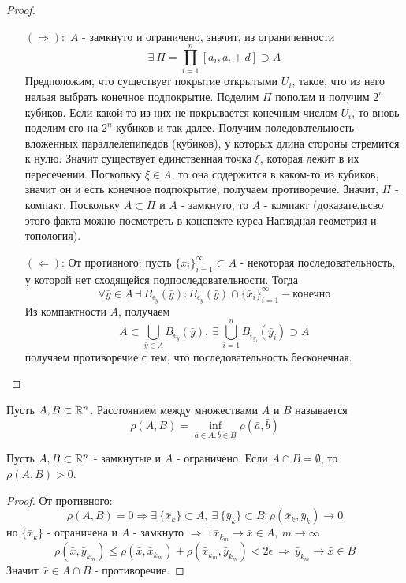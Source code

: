 \begin{proof}\tab
    \begin{itemize}
        \item[$(\Rightarrow):$] $A$ - замкнуто и ограничено, значит, из ограниченности
        \[\exists\ \Pi=\prod\limits_{i=1}^{n}[a_i, a_i+d]\supset A\] 
        Предположим, что существует покрытие открытыми $U_i$, такое, что из него нельзя выбрать конечное подпокрытие. Поделим $\Pi$ пополам и получим $2^n$ кубиков. Если какой-то из них не покрывается конечным числом $U_i$, то вновь поделим его на $2^n$ кубиков и так далее. Получим поледовательность вложенных параллелепипедов (кубиков), у которых длина стороны стремится к нулю. Значит существует единственная точка $\xi$, которая лежит в их пересечении. Поскольку $\xi \in A$, то она содержится в каком-то из кубиков, значит он и есть конечное подпокрытие, получаем противоречие. Значит, $\Pi$ - компакт. Поскольку $A\subset \Pi$ и $A$ - замкнуто, то $A$ - компакт (доказательсво этого факта можно посмотреть в конспекте курса \href{https://github.com/betel-git/Visual-geometry-and-topology}{Наглядная геометрия и топология}).
        \item[$(\Leftarrow)$:] От противного: пусть $\{\bar{x}_i\}_{i=1}^{\infty}\subset A$ - некоторая последовательность, у которой нет сходящейся подпоследовательности. Тогда 
        \[\forall \bar{y}\in A\ \exists\ B_{\epsilon_y}(\bar{y}): B_{\epsilon_y}(\bar{y})\cap \{\bar{x}_i\}_{i=1}^{\infty} - \text{конечно}\]
        Из компактности $A$, получаем
        \[A\subset \bigcup_{\bar{y}\in A}B_{\epsilon_{\bar{y}}}(\bar{y}),\ \exists\ \bigcup_{i=1}^n B_{\epsilon_{y_i}}(\bar{y}_i)\supset A\]
        получаем противоречие с тем, что последовательность бесконечная.
    \end{itemize}
\end{proof} 
\begin{definition}
    Пусть $A,B\subset \mathbb{R}^n$. Расстоянием между множествами $A$ и $B$ называется 
    \[\rho(A,B)=\inf\limits_{\bar{a}\in A,\bar{b}\in B}\rho(\bar{a}, \bar{b})\]
\end{definition} 
\begin{theorem}
    Пусть $A,B \subset \mathbb{R}^n$ - замкнутые и $A$ - ограничено. Если $A\cap B=\emptyset$, то $\rho(A,B)>0$. 
\end{theorem} 
\begin{proof}
    От противного:
    \[\rho(A,B)=0 \Rightarrow \exists\ \{\bar{x}_k\}\subset A,\ \exists\ \{\bar{y}_k\}\subset B: \rho(\bar{x}_k, \bar{y}_k)\to 0\] 
    но $\{\bar{x}_k\}$ - ограничена и $A$ - замкнуто $\Rightarrow \exists\ \bar{x}_{k_m}\to \bar{x}\in A,\ m\to \infty$
    \[\rho(\bar{x}, \bar{y}_{k_m})\leq \rho(\bar{x}, \bar{x}_{k_m})+\rho(\bar{x}_{k_m}, \bar{y}_{k_m})<2\epsilon\ \Rightarrow\ \bar{y}_{k_m}\to \bar{x}\in B\]
    Значит $\bar{x}\in A\cap B$ - противоречие.
\end{proof}

